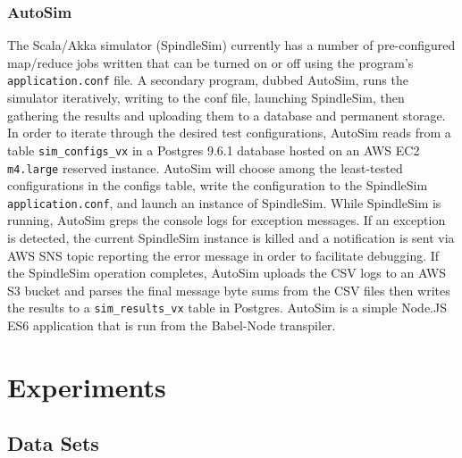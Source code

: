 \documentclass{thesis}
\begin{document}
\subsection{AutoSim}
    The Scala/Akka simulator (SpindleSim) currently has a number of pre-configured map/reduce jobs written
    that can be turned on or off using the program's \verb|application.conf| file. A secondary
    program, dubbed AutoSim, runs the simulator iteratively, writing to the conf file, launching
    SpindleSim, then gathering the results and uploading them to a database and permanent storage.
    In order to iterate through the desired test configurations, AutoSim reads from a table \verb|sim_configs_vx| in a 
    Postgres 9.6.1 database hosted on an AWS EC2 \verb|m4.large| reserved instance.
    AutoSim will choose among the least-tested configurations in the configs table, write the configuration to
    the SpindleSim \verb|application.conf|, and launch an instance of SpindleSim. While SpindleSim is running, AutoSim
    greps the console logs for exception messages. If an exception is detected, the current SpindleSim instance is killed
    and a notification is sent via AWS SNS topic reporting the error message in order to facilitate debugging. If the SpindleSim
    operation completes, AutoSim uploads the CSV logs to an AWS S3 bucket and parses the final message byte sums from the CSV
    files then writes the results to a \verb|sim_results_vx| table in Postgres. AutoSim is a simple Node.JS ES6 application
    that is run from the Babel-Node \cite{babel} transpiler.


\chapter{Experiments}
\section{Data Sets}
\end{document}
